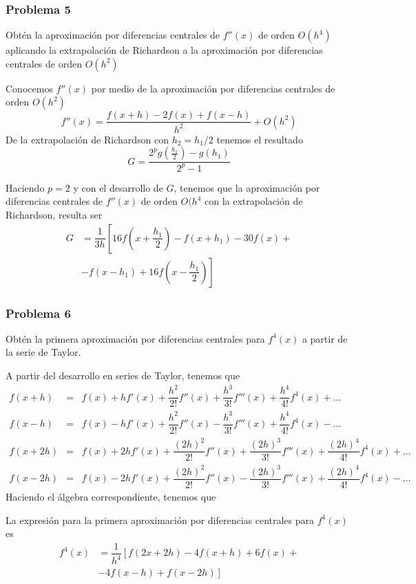 \begin{frame}
\frametitle{Problema 5}
Obtén la aproximación por diferencias centrales de $f''(x)$ de orden $O(h^{4})$ aplicando la extrapolación de Richardson a la aproximación por diferencias centrales de orden $O(h^{2})$
\end{frame}
\begin{frame}
Conocemos $f''(x)$ por medio de la aproximación por diferencias centrales de orden $O(h^{2})$
\[ f''(x) = \dfrac{f(x+h)-2f(x)+f(x-h)}{h^{2}} + O(h^{2})\]
De la extrapolación de Richardson con $h_{2} = h_{1}/2$ tenemos el resultado
\[ G = \dfrac{2^{p} g\left( \frac{h_{1}}{2} \right) - g(h_{1})}{2^{p}-1} \]
\end{frame}
\begin{frame}
Haciendo $p=2$ y con el desarrollo de $G$, tenemos que la aproximación por diferencias centrales de $f''(x)$ de orden $O(h^{4}$ con la extrapolación de Richardson, resulta ser
\[ \begin{split}
 G &= \dfrac{1}{3h} \left[ 16 f \left( x + \dfrac{h_{1}}{2} \right) - f(x+h_{1}) - 30 f(x) + \right. \\
 &- \left. f(x-h_{1}) + 16 f \left( x - \dfrac{h_{1}}{2} \right) \right]
\end{split} \]
\end{frame}
\begin{frame}
\frametitle{Problema 6}
Obtén la primera aproximación por diferencias centrales para $f^{4}(x)$ a partir de la serie de Taylor.
\end{frame}
\begin{frame}
A partir del desarrollo en series de Taylor, tenemos que
\fontsize{10}{10}\selectfont
\begin{eqnarray*}
f(x+h) &=& f(x) + hf'(x) + \dfrac{h^{2}}{2!}f''(x) + \dfrac{h^{3}}{3!}f'''(x) + \dfrac{h^{4}}{4!}f^{4}(x) + \ldots \\
f(x-h) &=& f(x) - hf'(x) + \dfrac{h^{2}}{2!}f''(x) - \dfrac{h^{3}}{3!}f'''(x) + \dfrac{h^{4}}{4!}f^{4}(x) - \ldots \\
f(x+2h) &=& f(x) + 2hf'(x) + \dfrac{(2h)^{2}}{2!}f''(x) + \dfrac{(2h)^{3}}{3!}f'''(x) + \dfrac{(2h)^{4}}{4!}f^{4}(x) + \ldots \\
f(x-2h) &=& f(x) - 2hf'(x) + \dfrac{(2h)^{2}}{2!}f''(x) - \dfrac{(2h)^{3}}{3!}f'''(x) + \dfrac{(2h)^{4}}{4!}f^{4}(x) - \ldots
\end{eqnarray*}
\fontsize{14}{14}\selectfont
Haciendo el álgebra correspondiente, tenemos que
\end{frame}
\begin{frame}
La expresión para la primera aproximación por diferencias centrales para $f^{4}(x)$ es
\[ \begin{split}
 f^{4}(x) &=  \dfrac{1}{h^{4}} \left[ f(2x+2h) - 4f(x+h)+6f(x) + \right. \\
 &- \left. 4f(x-h)+f(x-2h) \right] \end{split} \]
\end{frame}
